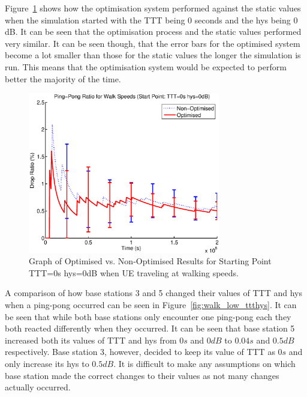 Figure~\ref{fig:walk_low_ping} shows how the optimisation system performed against the static values when the simulation started with the TTT being 0 seconds and the hys being 0 dB. It can be seen that the optimisation process and the static values performed very similar. It can be seen though, that the error bars for the optimised system become a lot smaller than those for the static values the longer the simulation is run. This means that the optimisation system would be expected to perform better the majority of the time.
\begin{figure}[H]
  \begin{center}
    	  \includegraphics[width=0.75\textwidth]{figures/walking_figures/walklow.eps}
    \end{center}
    \caption{Graph of Optimised vs. Non-Optimised Results for Starting Point TTT=0s hys=0dB when UE traveling at walking speeds.}
    \label{fig:walk_low_ping}
\end{figure}
A comparison of how base stations 3 and 5 changed their values of TTT and hys when a ping-pong occurred can be seen in Figure~\ref{fig:walk_low_ttthys}. It can be seen that while both base stations only encounter one ping-pong each they both reacted differently when they occurred. It can be seen that base station 5 increased both its values of TTT and hys from $0 s$ and $0 dB$ to $0.04 s$ and $0.5 dB$ respectively.  Base station 3, however, decided to keep its value of TTT as $0 s$ and only increase its hys to $0.5 dB$. It is difficult to make any assumptions on which base station made the correct changes to their values as not many changes actually occurred.
